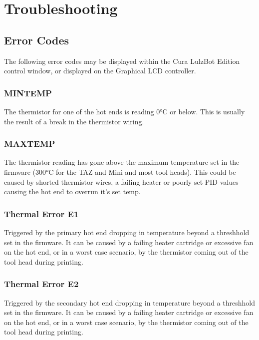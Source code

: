 %
%
%
%
%

\section{Troubleshooting}
\subsection{Error Codes}
The following error codes may be displayed within the Cura LulzBot Edition control window, or displayed on the Graphical LCD controller. 

\subsubsection{MINTEMP}
The thermistor for one of the hot ends is reading 0°C or below. This is usually the result of a break in the thermistor wiring.

\subsubsection{MAXTEMP}
The thermistor reading has gone above the maximum temperature set in the firmware (300°C for the TAZ and Mini and most tool heads). This could be caused by shorted thermistor wires, a failing heater or poorly set PID values causing the hot end to overrun it’s set temp.

\subsubsection{Thermal Error E1}
Triggered by the primary hot end dropping in temperature beyond a threshhold set in the firmware. It can be caused by a failing heater cartridge or excessive fan on the hot end, or in a worst case scenario, by the thermistor coming out of the tool head during printing.

\subsubsection{Thermal Error E2}
Triggered by the secondary hot end dropping in temperature beyond a threshhold set in the firmware. It can be caused by a failing heater cartridge or excessive fan on the hot end, or in a worst case scenario, by the thermistor coming out of the tool head during printing.

